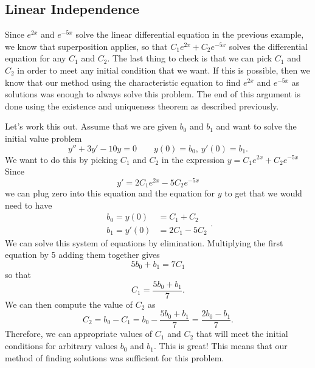 \subsection{Linear Independence}

Since $e^{2x}$ and $e^{-5x}$ solve the linear differential equation in the previous example, we know that superposition applies, so that $C_1e^{2x} + C_2e^{-5x}$ solves the differential equation for any $C_1$ and $C_2$. The last thing to check is that we can pick $C_1$ and $C_2$ in order to meet any initial condition that we want. If this is possible, then we know that our method using the characteristic equation to find $e^{2x}$ and $e^{-5x}$ as solutions was enough to always solve this problem. The end of this argument is done using the existence and uniqueness theorem as described previously.

Let's work this out. Assume that we are given $b_0$ and $b_1$ and want to solve the initial value problem
\begin{equation*}
y'' + 3y' - 10y = 0 \qquad y(0) = b_0,\ y'(0) = b_1.
\end{equation*}
We want to do this by picking $C_1$ and $C_2$ in the expression $y=C_1e^{2x} + C_2e^{-5x}$ Since 
\begin{equation*}
y' = 2C_1e^{2x} - 5C_2e^{-5x}
\end{equation*}
we can plug zero into this equation and the equation for $y$ to get that we would need to have
\begin{equation*}
\begin{split}
b_0 = y(0) &= C_1 + C_2 \\
b_1 = y'(0) &= 2C_1 - 5C_2
\end{split}.
\end{equation*}
We can solve this system of equations by elimination. Multiplying the first equation by 5 adding them together gives
\begin{equation*}
5b_0 + b_1 = 7C_1
\end{equation*}
so that
\begin{equation*}
C_1 = \frac{5b_0 + b_1}{7}.
\end{equation*}
We can then compute the value of $C_2$ as 
\begin{equation*}
C_2 = b_0 - C_1 = b_0 - \frac{5b_0 + b_1}{7} = \frac{2b_0 - b_1}{7}.
\end{equation*}
Therefore, we can appropriate values of $C_1$ and $C_2$ that will meet the initial conditions for arbitrary values $b_0$ and $b_1$. This is great! This means that our method of finding solutions was sufficient for this problem. 

